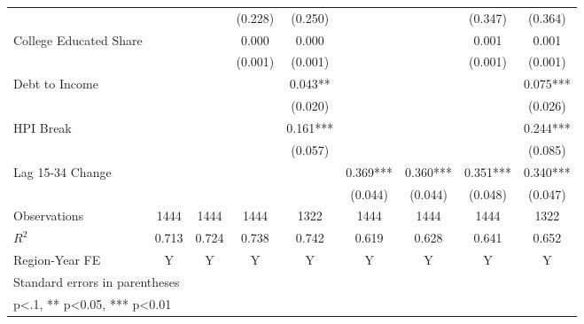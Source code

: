 \begin{table}[htbp]
\begin{tabular}{l*{8}{c}}
                    &            &            &  (0.228)   &  (0.250)   &            &            &  (0.347)   &  (0.364)   \\
\addlinespace
College Educated Share&            &            &    0.000   &    0.000   &            &            &    0.001   &    0.001   \\
                    &            &            &  (0.001)   &  (0.001)   &            &            &  (0.001)   &  (0.001)   \\
\addlinespace
Debt to Income      &            &            &            &    0.043** &            &            &            &    0.075***\\
                    &            &            &            &  (0.020)   &            &            &            &  (0.026)   \\
\addlinespace
HPI Break           &            &            &            &    0.161***&            &            &            &    0.244***\\
                    &            &            &            &  (0.057)   &            &            &            &  (0.085)   \\
\addlinespace
Lag 15-34 Change    &            &            &            &            &    0.369***&    0.360***&    0.351***&    0.340***\\
                    &            &            &            &            &  (0.044)   &  (0.044)   &  (0.048)   &  (0.047)   \\
\midrule
Observations        &     1444   &     1444   &     1444   &     1322   &     1444   &     1444   &     1444   &     1322   \\
\(R^{2}\)           &    0.713   &    0.724   &    0.738   &    0.742   &    0.619   &    0.628   &    0.641   &    0.652   \\
Region-Year FE      &        Y   &        Y   &        Y   &        Y   &        Y   &        Y   &        Y   &        Y   \\
\bottomrule
\multicolumn{9}{l}{\footnotesize Standard errors in parentheses}\\
\multicolumn{9}{l}{\footnotesize * p<.1, ** p<0.05, *** p<0.01}\\
\end{tabular}
\end{table}
